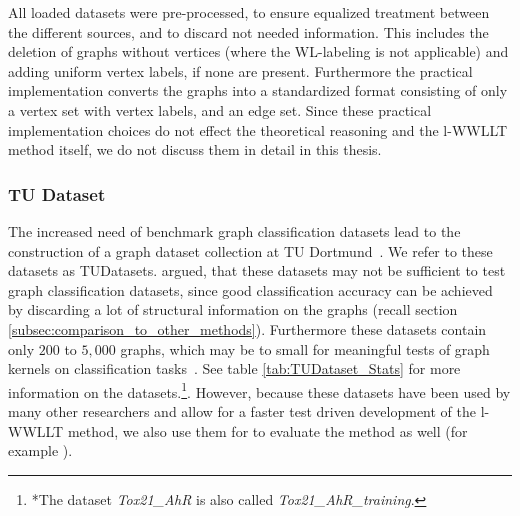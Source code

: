 		All loaded datasets were pre-processed, to ensure equalized treatment between the different sources, and to discard not needed information.
		This includes the deletion of graphs without vertices (where the WL-labeling is not applicable) and adding uniform vertex labels, if none are present.
		Furthermore the practical implementation converts the graphs into a standardized format consisting of only a vertex set with vertex labels, and an edge set.
		Since these practical implementation choices do not effect the theoretical reasoning and the l-WWLLT method itself, we do not discuss them in detail in this thesis.
		
		\subsubsection{TU Dataset} \label{subsec:TUDataset}
			
			The increased need of benchmark graph classification datasets lead to the construction of a graph dataset collection at TU Dortmund~\cite{2016_Kersting_CONF, 2020_Morris_CONF}.
			We refer to these datasets as TUDatasets.
			\citeauthor{2021_Schulz_CONF} argued, that these datasets may not be sufficient to test graph classification datasets, since good classification accuracy can be achieved by discarding a lot of structural information on the graphs (recall section \ref{subsec:comparison_to_other_methods}).
			Furthermore these datasets contain only $200$ to $5,000$ graphs, which may be to small for meaningful tests of graph kernels on classification tasks~\cite{2021_Schulz_CONF}.
			See table \ref{tab:TUDataset_Stats} for more information on the datasets.\footnote{*The dataset \textit{Tox21\_AhR} is also called \textit{Tox21\_AhR\_training}.}.
			However, because these datasets have been used by many other researchers and allow for a faster test driven development of the l-WWLLT method, we also use them for to evaluate the method as well (for example \cite{2007_Wale_CONF, 2016_Kriege_NIPS, 2011_Shervashidze_JMLR, 2015_Yanardag_CONF, 2020_Siglidis_CONF, 2020_Dwivedi_CONF, 2021_Schulz_CONF}).
			
